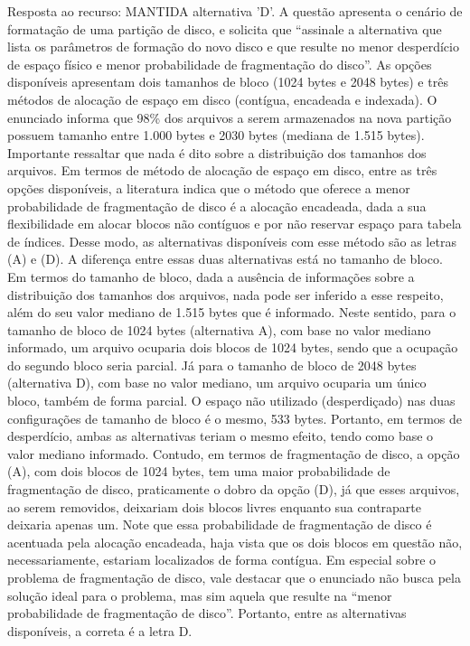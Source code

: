 {\begin{question}{}
\ifgabarito
{\color{red} Resposta ao recurso: MANTIDA alternativa 'D'. A questão apresenta o cenário de formatação de uma partição de disco, e solicita que “assinale a alternativa que lista os parâmetros de formação do novo disco e que resulte no menor desperdício de espaço físico e menor probabilidade de fragmentação do disco”. As opções disponíveis apresentam dois tamanhos de bloco (1024 bytes e 2048 bytes) e três métodos de alocação de espaço em disco (contígua, encadeada e indexada). O enunciado informa que 98\% dos arquivos a serem armazenados na nova partição possuem tamanho entre 1.000 bytes e 2030 bytes (mediana de 1.515 bytes). Importante ressaltar que nada é dito sobre a distribuição dos tamanhos dos arquivos. Em termos de método de alocação de espaço em disco, entre as três opções disponíveis, a literatura indica que o método que oferece a menor probabilidade de fragmentação de disco é a alocação encadeada, dada a sua flexibilidade em alocar blocos não contíguos e por não reservar espaço para tabela de índices. Desse modo, as alternativas disponíveis com esse método são as letras (A) e (D). A diferença entre essas duas alternativas está no tamanho de bloco. Em termos do tamanho de bloco, dada a ausência de informações sobre a distribuição dos tamanhos dos arquivos, nada pode ser inferido a esse respeito, além do seu valor mediano de 1.515 bytes que é informado. Neste sentido, para o tamanho de bloco de 1024 bytes (alternativa A), com base no valor mediano informado, um arquivo ocuparia dois blocos de 1024 bytes, sendo que a ocupação do segundo bloco seria parcial. Já para o tamanho de bloco de 2048 bytes (alternativa D), com base no valor mediano, um arquivo ocuparia um único bloco, também de forma parcial. O espaço não utilizado (desperdiçado) nas duas configurações de tamanho de bloco é o mesmo, 533 bytes. Portanto, em termos de desperdício, ambas as alternativas teriam o mesmo efeito, tendo como base o valor mediano informado. Contudo, em termos de fragmentação de disco, a opção (A), com dois blocos de 1024 bytes, tem uma maior probabilidade de fragmentação de disco, praticamente o dobro da opção (D), já que esses arquivos, ao serem removidos, deixariam dois blocos livres enquanto sua contraparte deixaria apenas um. Note que essa probabilidade de fragmentação de disco é acentuada pela alocação encadeada, haja vista que os dois blocos em questão não, necessariamente, estariam localizados de forma contígua. Em especial sobre o problema de fragmentação de disco, vale destacar que o enunciado não busca pela solução ideal para o problema, mas sim aquela que resulte na “menor probabilidade de fragmentação de disco”. Portanto, entre as alternativas disponíveis, a correta é a letra D.}
\else
\fi
\end{question}
}
